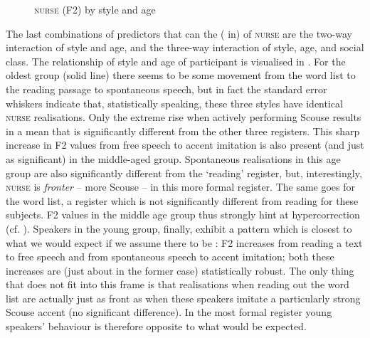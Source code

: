 \begin{figure}
	
		\resizebox{0.5\linewidth}{!}{} 
	\caption{\textsc{nurse} (F2) by style and age}
	\label{fig.line.f2.nurse.tot}
\end{figure}

The last combinations of predictors that can  the ( in)  of \textsc{nurse} are the two-way interaction of style and age, and the three-way interaction of style, age, and social class.
The relationship of style and age of participant is visualised in .
For the oldest group (solid line) there seems to be some movement from the word list to the reading passage to spontaneous speech, but in fact the standard error whiskers indicate that, statistically speaking, these three styles have identical \textsc{nurse} realisations.
Only the extreme rise when actively performing Scouse results in a mean that is significantly different from the other three registers.
This sharp increase in F2 values from free speech to accent imitation is also present (and just as significant) in the middle-aged group.
Spontaneous realisations in this age group are also significantly different from the `reading' register, but, interestingly, \textsc{nurse} is \emph{fronter} -- more Scouse -- in this more formal register.
The same goes for the word list, a register which is not significantly different from reading for these subjects.
F2 values in the middle age group thus strongly hint at hypercorrection (cf. ).
Speakers in the young group, finally, exhibit a pattern which is closest to what we would expect if we assume there to be : F2 increases from reading a text to free speech and from spontaneous speech to accent imitation; both these increases are (just about in the former case) statistically robust.
The only thing that does not fit into this frame is that realisations when reading out the word list are actually just as front as when these speakers imitate a particularly strong Scouse accent (no significant difference).
In the most formal register young speakers' behaviour is therefore opposite to what would be expected.

